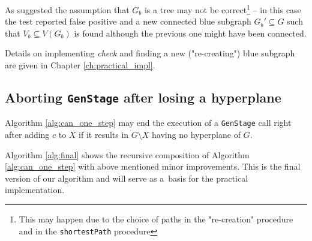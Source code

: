 As suggested the assumption that $G_b$ is a tree may not be correct\footnote{This may happen due to the choice of paths in the "re-creation" procedure and in the \lstinline|shortestPath| procedure} -- in this case the test reported false positive and a new connected blue subgraph $G_b' \subseteq G$ such that $V_b \subseteq V(G_b)$ is found although the previous one might have been connected.

Details on implementing \textit{check} and finding a new ("re-creating") blue subgraph are given in Chapter \ref{ch:practical_impl}.

\subsection*{Aborting \lstinline|GenStage| after losing a hyperplane}

\begin{claim}
	Algorithm \ref{alg:can_one_step} may end the execution of a \lstinline|GenStage| call right after adding $c$ to $X$ if it results in $G \setminus X$ having no hyperplane of $G$.
\end{claim}

\sectionline

Algorithm \ref{alg:final} shows the recursive composition of Algorithm \ref{alg:can_one_step} with above mentioned minor improvements. This is the final version of our algorithm and will serve as a~basis for the practical implementation.

\clearpage

